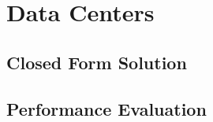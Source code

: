 \section{Data Centers}\label{sec:cloud:data_centers}
\cite{Schwartz2012a}


\subsection{Closed Form Solution}\label{sec:cloud:data_centers:closed_form_solution}
\subsection{Performance Evaluation}\label{sec:cloud:data_centers:performance_evaluation}
